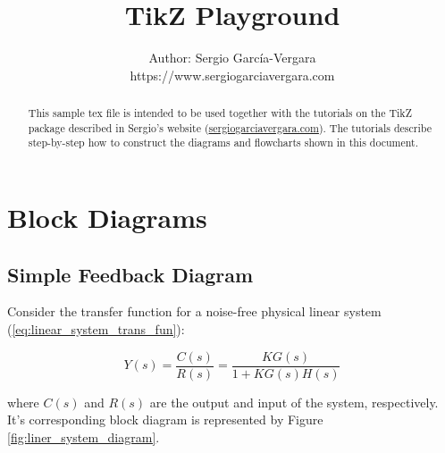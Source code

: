\documentclass[11pt]{article}
\begin{document}

\title{TikZ Playground}
\author{
  Author: Sergio Garc\'{i}a-Vergara \\
  \small{https://www.sergiogarciavergara.com}
}

\maketitle


\begin{abstract}
  This sample tex file is intended to be used together with the tutorials on the
  TikZ package described in Sergio's website
  (\href{https://www.sergiogarciavergara.com/block-diagrams-in-latex/}{sergiogarciavergara.com}). The
  tutorials describe step-by-step how to construct the diagrams and flowcharts
  shown in this document.

\end{abstract}



\section{Block Diagrams}

\subsection{Simple Feedback Diagram}

Consider the transfer function for a noise-free physical linear system
(\ref{eq:linear_system_trans_fun}):

\begin{equation}\label{eq:linear_system_trans_fun}
Y(s) = \frac{C(s)}{R(s)} = \frac{KG(s)}{1 + KG(s)H(s)}
\end{equation}

\noindent
where $C(s)$ and $R(s)$ are the output and input of the system,
respectively. It's corresponding block diagram is represented by Figure
\ref{fig:liner_system_diagram}.
\end{document}
